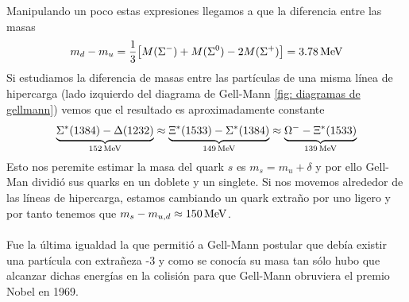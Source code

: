 \noindent Manipulando un poco estas expresiones llegamos a que la diferencia entre las masas $$m_d-m_u=\dfrac{1}{3}\qty[M(\Sigma^-)+M(\Sigma^0)-2M(\Sigma^+)]=\unit[3.78]{MeV}$$
Si estudiamos la diferencia de masas entre las partículas de una misma línea de hipercarga (lado izquierdo del diagrama de Gell-Mann \ref{fig: diagramas de gellmann}) vemos que el resultado es aproximadamente constante $$\underbrace{\Sigma^*(1384)-\Delta(1232)}_{\unit[152]{MeV}}\approx \underbrace{\Xi^*(1533)-\Sigma^*(1384)}_{\unit[149]{MeV}}\approx \underbrace{\Omega^--\Xi^*(1533)}_{\unit[139]{MeV}}$$ Esto nos peremite estimar la masa del quark $s$ es $m_s=m_u+\delta$ y por ello Gell-Man dividió sus quarks en un doblete y un singlete. Si nos movemos alrededor de las líneas de hipercarga, estamos cambiando un quark extraño por uno ligero y por tanto tenemos que $m_s-m_{u,d}\approx \unit[150]{MeV}$.\\\\ Fue la última igualdad la que permitió a Gell-Mann postular que debía existir una partícula con extrañeza -3 y como se conocía su masa tan sólo hubo que alcanzar dichas energías en la colisión para que Gell-Mann obruviera el premio Nobel en 1969.
